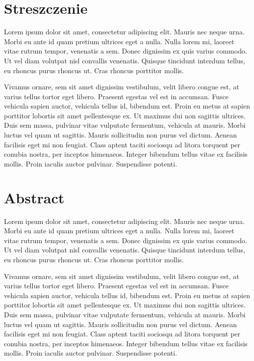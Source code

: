 \documentclass[a4paper,12pt,oneside]{book}
\begin{document}
	\thispagestyle{empty}
	
	
	\newpage
	\thispagestyle{empty}
	\chapter*{Streszczenie}
		Lorem ipsum dolor sit amet, consectetur adipiscing elit. Mauris nec neque urna. Morbi eu ante id quam pretium ultrices eget a nulla. Nulla lorem mi, laoreet vitae rutrum tempor, venenatis a sem. Donec dignissim ex quis varius commodo. Ut vel diam volutpat nisl convallis venenatis. Quisque tincidunt interdum tellus, eu rhoncus purus rhoncus ut. Cras rhoncus porttitor mollis.
	
		Vivamus ornare, sem sit amet dignissim vestibulum, velit libero congue est, at varius tellus tortor eget libero. Praesent egestas vel est in accumsan. Fusce vehicula sapien auctor, vehicula tellus id, bibendum est. Proin eu metus at sapien porttitor lobortis sit amet pellentesque ex. Ut maximus dui non sagittis ultrices. Duis sem massa, pulvinar vitae vulputate fermentum, vehicula at mauris. Morbi luctus vel quam ut sagittis. Mauris sollicitudin non purus vel dictum. Aenean facilisis eget mi non feugiat. Class aptent taciti sociosqu ad litora torquent per conubia nostra, per inceptos himenaeos. Integer bibendum tellus vitae ex facilisis mollis. Proin iaculis auctor pulvinar. Suspendisse potenti.
	
		\newpage
	\thispagestyle{empty}
	\chapter*{Abstract}
		Lorem ipsum dolor sit amet, consectetur adipiscing elit. Mauris nec neque urna. Morbi eu ante id quam pretium ultrices eget a nulla. Nulla lorem mi, laoreet vitae rutrum tempor, venenatis a sem. Donec dignissim ex quis varius commodo. Ut vel diam volutpat nisl convallis venenatis. Quisque tincidunt interdum tellus, eu rhoncus purus rhoncus ut. Cras rhoncus porttitor mollis.
	
		Vivamus ornare, sem sit amet dignissim vestibulum, velit libero congue est, at varius tellus tortor eget libero. Praesent egestas vel est in accumsan. Fusce vehicula sapien auctor, vehicula tellus id, bibendum est. Proin eu metus at sapien porttitor lobortis sit amet pellentesque ex. Ut maximus dui non sagittis ultrices. Duis sem massa, pulvinar vitae vulputate fermentum, vehicula at mauris. Morbi luctus vel quam ut sagittis. Mauris sollicitudin non purus vel dictum. Aenean facilisis eget mi non feugiat. Class aptent taciti sociosqu ad litora torquent per conubia nostra, per inceptos himenaeos. Integer bibendum tellus vitae ex facilisis mollis. Proin iaculis auctor pulvinar. Suspendisse potenti.
	
\end{document}
